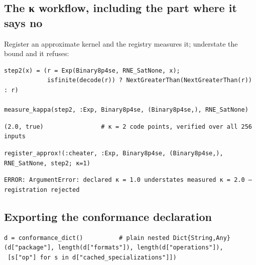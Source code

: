 \subsection{The κ workflow, including the part where it says no}



\label{64156751436703573}{}


Register an approximate kernel and the registry measures it; understate the bound and it refuses:




\begin{verbatim}
step2(x) = (r = Exp(Binary8p4se, RNE_SatNone, x);
            isfinite(decode(r)) ? NextGreaterThan(NextGreaterThan(r)) : r)

measure_kappa(step2, :Exp, Binary8p4se, (Binary8p4se,), RNE_SatNone)
\end{verbatim}




\begin{verbatim}
(2.0, true)                # κ = 2 code points, verified over all 256 inputs
\end{verbatim}




\begin{verbatim}
register_approx!(:cheater, :Exp, Binary8p4se, (Binary8p4se,), RNE_SatNone, step2; κ=1)
\end{verbatim}




\begin{verbatim}
ERROR: ArgumentError: declared κ = 1.0 understates measured κ = 2.0 — registration rejected
\end{verbatim}



\subsection{Exporting the conformance declaration}



\label{14596415327394333925}{}



\begin{verbatim}
d = conformance_dict()          # plain nested Dict{String,Any}
(d["package"], length(d["formats"]), length(d["operations"]),
 [s["op"] for s in d["cached_specializations"]])
\end{verbatim}



